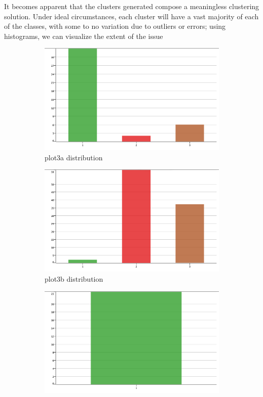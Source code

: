 \documentclass[11pt]{article}
\begin{document}
		 	\fi
			It becomes apparent that the clusters generated compose a meaningless clustering solution. Under ideal circumstances, each cluster will have a vast majority of each of the classes, with some to no variation due to outliers or errors; using histograms, we can visualize the extent of the issue 
			\iftrue
			\begin{figure}[H]
				\centering
				\begin{subfigure}{0.4\textwidth}
			 		\includegraphics[width=\textwidth]{res/t1/t14/t14-plota-dist}
					\caption{plot3a distribution}
					\label{fig:first}
				\end{subfigure}
				\hfill
				\begin{subfigure}{0.4\textwidth}
			 		\includegraphics[width=\textwidth]{res/t1/t14/t14-plotb-dist}
					\caption{plot3b distribution}
					\label{fig:second}
				\end{subfigure}
				\hfill
				\begin{subfigure}{0.4\textwidth}
			 		\includegraphics[width=\textwidth]{res/t1/t14/t14-plotc-dist}

\end{subfigure}
\end{figure}
\end{document}
